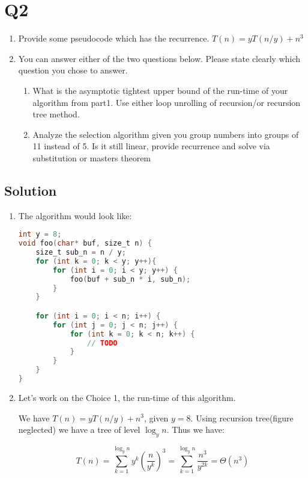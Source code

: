 
\section*{Q2}

\begin{enumerate}
    \item Provide some pseudocode which has the recurrence.
          $T(n) = yT(n/y) + n^3$
    \item You can answer either of the two questions below.
          Please state clearly which question you chose to answer.
          \begin{enumerate}
              \item What is the asymptotic tightest upper bound of the run-time of your algorithm from part1.
                    Use either loop unrolling of recursion/or recursion tree method.
              \item Analyze the selection algorithm given you group numbers into groups of 11 instead of 5.
                    Is it still linear, provide recurrence and solve via substitution or masters theorem
          \end{enumerate}
\end{enumerate}



\subsection*{Solution}

\begin{enumerate}
    \item The algorithm would look like:

          \begin{minipage}{\linewidth}
              \begin{lstlisting}[language=C]
int y = 8;
void foo(char* buf, size_t n) {
    size_t sub_n = n / y;
    for (int k = 0; k < y; y++){
        for (int i = 0; i < y; y++) {
            foo(buf + sub_n * i, sub_n);
        }
    }

    for (int i = 0; i < n; i++) {
        for (int j = 0; j < n; j++) {
            for (int k = 0; k < n; k++) {
                // TODO
            }
        }
    }
}
\end{lstlisting}
          \end{minipage}

    \item Let's work on the Choice 1, the run-time of this algorithm.

          We have $T(n) = yT(n/y) + n^3$, given $y=8$.
          Using recursion tree(figure neglected) we have a tree of level $\log_y n$.
          Thus we have:

          $$T(n) = \sum_{k=1}^{\log_y n} y^k (\frac{n}{y^k})^3 = \sum_{k=1}^{\log_y n} \frac{n^3}{y^{2k}} = \Theta(n^3) $$

\end{enumerate}
